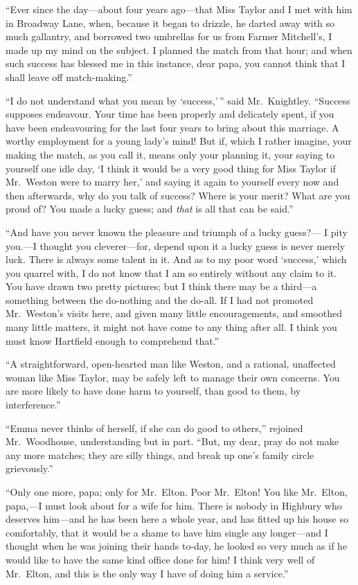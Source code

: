 ``Ever since the day---about four years ago---that Miss Taylor and I
met with him in Broadway Lane, when, because it began to drizzle,
he darted away with so much gallantry, and borrowed two umbrellas
for us from Farmer Mitchell's, I made up my mind on the subject.
I planned the match from that hour; and when such success has blessed
me in this instance, dear papa, you cannot think that I shall leave
off match-making.''

``I do not understand what you mean by `success,'\,'' said Mr.\ Knightley.
``Success supposes endeavour.  Your time has been properly and
delicately spent, if you have been endeavouring for the last four
years to bring about this marriage.  A worthy employment for a young
lady's mind! But if, which I rather imagine, your making the match,
as you call it, means only your planning it, your saying to yourself
one idle day, `I think it would be a very good thing for Miss Taylor
if Mr.\ Weston were to marry her,' and saying it again to yourself
every now and then afterwards, why do you talk of success? Where
is your merit? What are you proud of? You made a lucky guess;
and \emph{that} is all that can be said.''

``And have you never known the pleasure and triumph of a lucky guess?---%
I pity you.---I thought you cleverer---for, depend upon it a lucky
guess is never merely luck.  There is always some talent in it.
And as to my poor word `success,' which you quarrel with, I do not
know that I am so entirely without any claim to it.  You have drawn
two pretty pictures; but I think there may be a third---a something
between the do-nothing and the do-all. If I had not promoted Mr.\ Weston's
visits here, and given many little encouragements, and smoothed
many little matters, it might not have come to any thing after all.
I think you must know Hartfield enough to comprehend that.''

``A straightforward, open-hearted man like Weston, and a rational,
unaffected woman like Miss Taylor, may be safely left to manage their
own concerns.  You are more likely to have done harm to yourself,
than good to them, by interference.''

``Emma never thinks of herself, if she can do good to others,''
rejoined Mr.\ Woodhouse, understanding but in part.  ``But, my dear,
pray do not make any more matches; they are silly things, and break up
one's family circle grievously.''

``Only one more, papa; only for Mr.\ Elton.  Poor Mr.\ Elton! You
like Mr.\ Elton, papa,---I must look about for a wife for him.
There is nobody in Highbury who deserves him---and he has been
here a whole year, and has fitted up his house so comfortably,
that it would be a shame to have him single any longer---and I thought
when he was joining their hands to-day, he looked so very much as if
he would like to have the same kind office done for him! I think
very well of Mr.\ Elton, and this is the only way I have of doing
him a service.''

